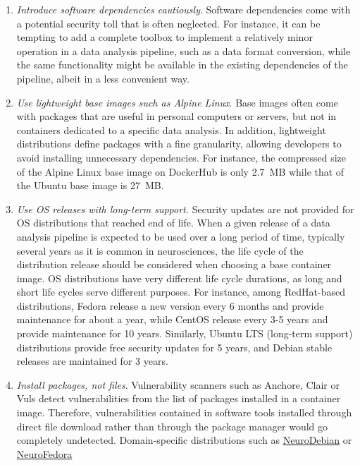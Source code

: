 \documentclass[a4paper,num-refs]{oup-contemporary}
\begin{document}
\begin{enumerate}[leftmargin=0pt,itemindent=*]
\item \emph{Introduce software dependencies cautiously}. Software
dependencies come with a potential security toll that is often neglected.
For instance, it can be tempting to add a complete toolbox to implement a
relatively minor operation in a data analysis pipeline, such as a data
format conversion, while the same functionality might be available in the
existing dependencies of the pipeline, albeit in a less convenient way.
\item \emph{Use lightweight base images such as Alpine Linux}. Base
images often come with packages that are useful in personal computers or
servers, but not in containers dedicated to a specific data analysis. In
addition, lightweight distributions define packages with a fine
granularity, allowing developers to avoid installing unnecessary
dependencies. For instance, the compressed size of the Alpine Linux base
image on DockerHub is only 2.7~MB while that of the Ubuntu base image is
27~MB.
\item \emph{Use OS releases with long-term support.} Security updates are
not provided for OS distributions that reached end of life. When a given
release of a data analysis pipeline is expected to be used over a long
period of time, typically several years as it is common in neurosciences,
the life cycle of the distribution release should be considered when
choosing a base container image. OS distributions have very different life
cycle durations, as long and short life cycles serve different purposes.
For instance, among RedHat-based distributions, Fedora release a new version
every 6 months and provide maintenance for about a year, while CentOS
release every 3-5 years and provide maintenance for 10 years. Similarly,
Ubuntu LTS (long-term support) distributions provide free security updates
for 5 years, and Debian stable releases are maintained for 3 years. 
\item \emph{Install packages, not files}. Vulnerability scanners such as
Anchore, Clair or Vuls detect vulnerabilities from the list of packages
installed in a container image. Therefore, vulnerabilities contained in
software tools installed through direct file download rather than through
the package manager would go completely undetected. Domain-specific
distributions such as \href{http://neuro.debian.net}{NeuroDebian} or
\href{https://docs.fedoraproject.org/en-US/neurofedora/overview/}{NeuroFedora}

\end{enumerate}
\end{document}
